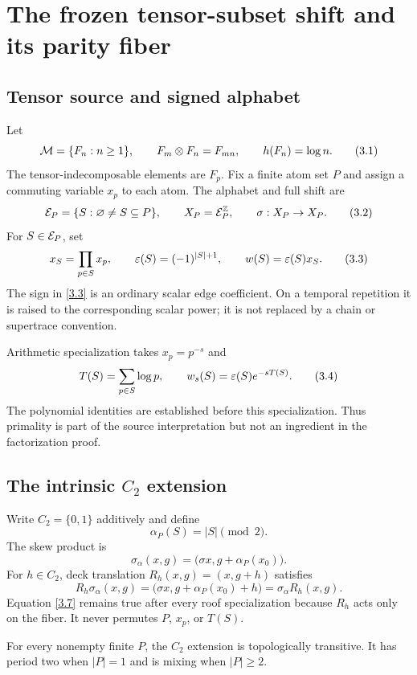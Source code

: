 \section{The frozen tensor-subset shift and its parity fiber}
\label{sec:source}

\subsection{Tensor source and signed alphabet}

Let
\[
\mathcal M=\{F_n:n\ge1\},\qquad
F_m\otimes F_n=F_{mn},\qquad h(F_n)=\log n.
\tag{3.1}\label{3.1}
\]
The tensor-indecomposable elements are \(F_p\).  Fix a finite atom set \(P\)
and assign a commuting variable \(x_p\) to each atom.  The alphabet and full
shift are
\[
\mathcal E_P=\{S:\varnothing\ne S\subseteq P\},\qquad
X_P=\mathcal E_P^{\mathbb Z},\qquad \sigma:X_P\to X_P.
\tag{3.2}\label{3.2}
\]
For \(S\in\mathcal E_P\), set
\[
x_S=\prod_{p\in S}x_p,\qquad
\varepsilon(S)=(-1)^{|S|+1},\qquad
w(S)=\varepsilon(S)x_S.
\tag{3.3}\label{3.3}
\]
The sign in \eqref{3.3} is an ordinary scalar edge coefficient.  On a temporal
repetition it is raised to the corresponding scalar power; it is not replaced
by a chain or supertrace convention.

Arithmetic specialization takes \(x_p=p^{-s}\) and
\[
T(S)=\sum_{p\in S}\log p,\qquad
w_s(S)=\varepsilon(S)e^{-sT(S)}.
\tag{3.4}\label{3.4}
\]
The polynomial identities are established before this specialization.  Thus
primality is part of the source interpretation but not an ingredient in the
factorization proof.

\subsection{The intrinsic \texorpdfstring{\(C_2\)}{C2} extension}

Write \(C_2=\{0,1\}\) additively and define
\[
\alpha_P(S)=|S|\pmod2.
\tag{3.5}\label{3.5}
\]
The skew product is
\[
\sigma_\alpha(x,g)=\bigl(\sigma x,g+\alpha_P(x_0)\bigr).
\tag{3.6}\label{3.6}
\]
For \(h\in C_2\), deck translation
\(R_h(x,g)=(x,g+h)\) satisfies
\[
R_h\sigma_\alpha(x,g)
=\bigl(\sigma x,g+\alpha_P(x_0)+h\bigr)
=\sigma_\alpha R_h(x,g).
\tag{3.7}\label{3.7}
\]
Equation \eqref{3.7} remains true after every roof specialization because
\(R_h\) acts only on the fiber.  It never permutes \(P\), \(x_p\), or \(T(S)\).

\begin{proposition}
\label{prop:mixing}
For every nonempty finite \(P\), the \(C_2\) extension is topologically
transitive.  It has period two when \(|P|=1\) and is mixing when \(|P|\ge2\).
\end{proposition}

